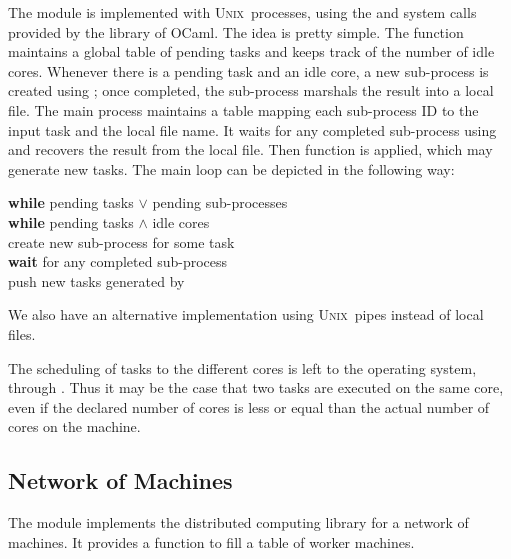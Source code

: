 \documentclass[a4paper,12pt]{article}
\newcommand{\Ocaml}{OCaml}
\newcommand{\unix}{\textsc{Unix}}
\begin{document}
The  module is implemented with \unix\ processes, using the
 and  system calls provided by the  library
of \Ocaml. The idea is pretty simple.  The  function
maintains a global table of pending tasks and keeps track of the
number of idle cores.  Whenever there is a pending task and an idle
core, a new sub-process is created using ; once
completed, the sub-process marshals the result into a 
local file. The
main process maintains a table mapping each sub-process ID to the
input task and the local file name. It waits for any completed
sub-process using  and recovers the result from the
local file. Then function  is applied, which may generate
new tasks.  The main loop can be depicted in the following way:
\begin{flushleft}
  \quad  \textbf{while} pending tasks $\lor$ pending sub-processes \\
  \quad  \quad \textbf{while} pending tasks $\land$ idle cores \\
  \quad  \quad \quad create new sub-process for some task \\
  \quad  \quad \textbf{wait} for any completed sub-process \\
  \quad  \quad \quad push new tasks generated by  \\
\end{flushleft}
We also have an alternative implementation using
\unix\ pipes instead of local files.

The scheduling of tasks to the different cores is left to the
operating system, through . Thus it may be the case that
two tasks are executed on the same core, even if the declared number
of cores is less or equal than the actual number of cores on the machine.

\subsection{Network of Machines}

The  module implements the distributed computing library
for a network of machines. 
It provides a function
 to fill a table of
worker machines. 
\end{document}
